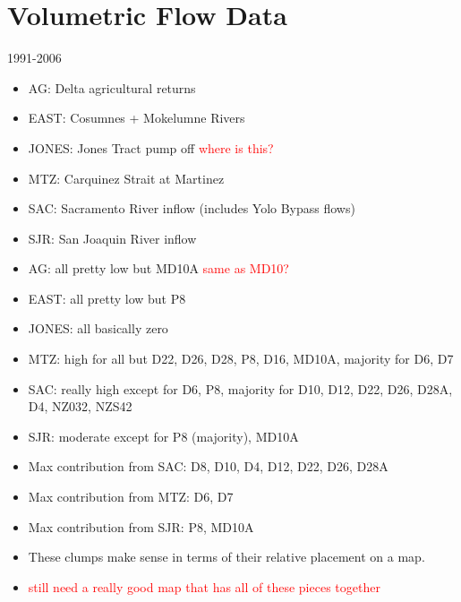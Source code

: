 \documentclass[12pt]{amsart}
\begin{document}
\section{Volumetric Flow Data}

1991-2006

\begin{itemize}
\item AG: Delta agricultural returns
\item EAST: Cosumnes + Mokelumne Rivers
\item JONES: Jones Tract pump off \textcolor{red}{where is this?}
\item MTZ: Carquinez Strait at Martinez
\item SAC: Sacramento River inflow (includes Yolo Bypass flows)
\item SJR: San Joaquin River inflow
\end{itemize}

\begin{itemize}
\item AG:  all pretty low but MD10A \textcolor{red}{same as MD10?}
\item EAST:  all pretty low but P8
\item JONES:  all basically zero
\item MTZ:  high for all but D22, D26, D28, P8, D16, MD10A, majority for D6, D7
\item SAC: really high except for D6, P8, majority for D10, D12, D22, D26, D28A, D4, NZ032, NZS42
\item SJR: moderate except for P8 (majority), MD10A
\end{itemize}

\begin{itemize}
\item Max contribution from SAC: D8, D10, D4, D12, D22, D26, D28A
\item Max contribution from MTZ: D6, D7
\item Max contribution from SJR: P8, MD10A
\item These clumps make sense in terms of their relative placement on a map.
\item \textcolor{red}{still need a really good map that has all of these pieces together}
\end{itemize}
\end{document}
